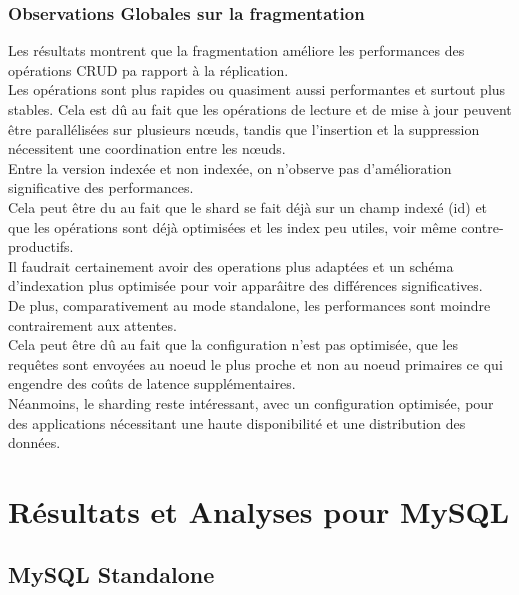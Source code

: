 \documentclass[12pt,a4paper]{report}
\begin{document}
        \subsection{Observations Globales sur la fragmentation}
            \begin{card}
                Les résultats montrent que la fragmentation améliore les performances des opérations CRUD pa rapport à la réplication. \\
                Les opérations sont plus rapides ou quasiment aussi performantes et surtout plus stables.
                Cela est dû au fait que les opérations de lecture et de mise à jour peuvent être parallélisées sur plusieurs nœuds, tandis que l'insertion et la suppression nécessitent une coordination entre les nœuds. \\
                Entre la version indexée et non indexée, on n'observe pas d'amélioration significative des performances. \\
                Cela peut être du au fait que le shard se fait déjà sur un champ indexé (id) et que les opérations sont déjà optimisées et les index peu utiles, voir même contre-productifs. \\
                Il faudrait certainement avoir des operations plus adaptées et un schéma d'indexation plus optimisée pour voir apparâitre des différences significatives. \\
                De plus, comparativement au mode standalone, les performances sont moindre contrairement aux attentes. \\
                Cela peut être dû au fait que la configuration n'est pas optimisée, que les requêtes sont envoyées au noeud le plus proche et non au noeud primaires ce qui engendre des coûts de latence supplémentaires. \\
                Néanmoins, le sharding reste intéressant, avec un configuration optimisée, pour des applications nécessitant une haute disponibilité et une distribution des données. \\
            \end{card}
                

\chapter{Résultats et Analyses pour MySQL}

\section{MySQL Standalone}
\end{document}
